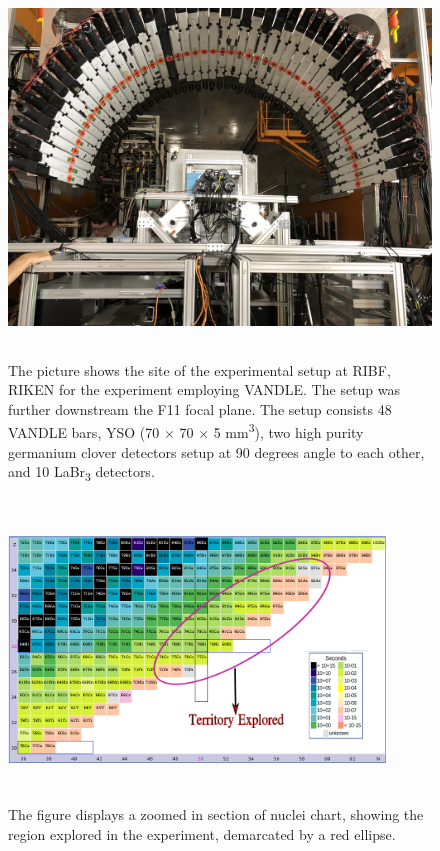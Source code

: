 \documentclass[a4paper,12pt,twoside]{report}
\begin{document}
\begin{figure}[h!]
    \centering
    \includegraphics[width=12cm,height=10cm]{vandle_ribf.jpg}
    \caption[The picture shows the site of the experimental setup]{The picture shows the site of the experimental setup at RIBF, RIKEN for the experiment employing VANDLE. The setup was further downstream the F11 focal plane. The setup consists 48 VANDLE bars, YSO (70 $\times$ 70 $\times$ 5  mm\textsuperscript{3}), two high purity germanium clover detectors setup at 90 degrees angle to each other, and 10 LaBr\textsubscript{3} detectors.}
    \label{fig:vandleribf}
\end{figure}

\begin{figure}[h!]
    \centering
    \includegraphics[width=10cm, height=8cm]{nuclie_chart_plot.png}
    \caption[The figure displays a zoomed-in section of nuclei chart]{The figure displays a zoomed in section of nuclei chart, showing the region explored in the experiment, demarcated by a red ellipse.}
    \label{fig:chart_nuclie}
\end{figure}
\end{document}

